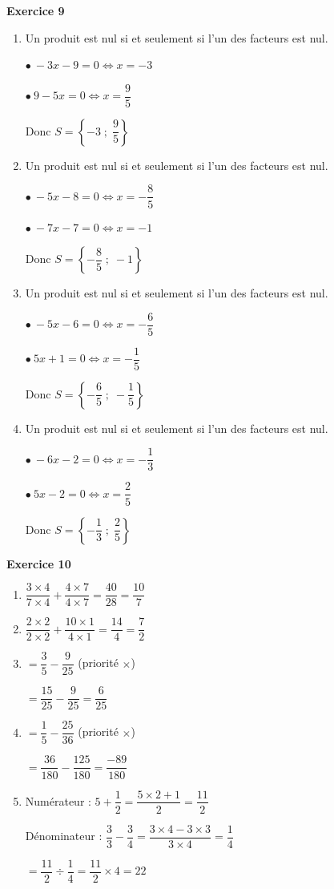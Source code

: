 \documentclass[12pt,a4paper,french]{article}
\begin{document}
\noindent\textbf{Exercice 9}\par
\smallskip
\begin{enumerate}
\item Un produit est nul si et seulement si l'un des facteurs est nul.

$\bullet\ -3x - 9 = 0 \Leftrightarrow x = -3$

$\bullet\ 9 - 5x = 0 \Leftrightarrow x = \dfrac{9}{5}$

Donc $S = \left\{-3 \; ; \; \dfrac{9}{5}\right\}$

\item Un produit est nul si et seulement si l'un des facteurs est nul.

$\bullet\ -5x - 8 = 0 \Leftrightarrow x = - \dfrac{8}{5}$

$\bullet\ -7x - 7 = 0 \Leftrightarrow x = -1$

Donc $S = \left\{- \dfrac{8}{5} \; ; \; -1\right\}$

\item Un produit est nul si et seulement si l'un des facteurs est nul.

$\bullet\ -5x - 6 = 0 \Leftrightarrow x = - \dfrac{6}{5}$

$\bullet\ 5x + 1 = 0 \Leftrightarrow x = - \dfrac{1}{5}$

Donc $S = \left\{- \dfrac{6}{5} \; ; \; - \dfrac{1}{5}\right\}$

\item Un produit est nul si et seulement si l'un des facteurs est nul.

$\bullet\ -6x - 2 = 0 \Leftrightarrow x = - \dfrac{1}{3}$

$\bullet\ 5x - 2 = 0 \Leftrightarrow x = \dfrac{2}{5}$

Donc $S = \left\{- \dfrac{1}{3} \; ; \; \dfrac{2}{5}\right\}$

\end{enumerate}
\medskip

\noindent\textbf{Exercice 10}\par
\smallskip
\begin{enumerate}
\item $\dfrac{3 \times 4}{7 \times 4} + \dfrac{4 \times 7}{4 \times 7} = \dfrac{40}{28} = \dfrac{10}{7}$
\item $\dfrac{2 \times 2}{2 \times 2} + \dfrac{10 \times 1}{4 \times 1} = \dfrac{14}{4} = \dfrac{7}{2}$
\item $= \dfrac{3}{5} - \dfrac{9}{25}$ (priorité $\times$)

$= \dfrac{15}{25} - \dfrac{9}{25} = \dfrac{6}{25}$
\item $= \dfrac{1}{5} - \dfrac{25}{36}$ (priorité $\times$)

$= \dfrac{36}{180} - \dfrac{125}{180} = \dfrac{-89}{180}$
\item Numérateur : $5 + \dfrac{1}{2} = \dfrac{5 \times 2 + 1}{2} = \dfrac{11}{2}$

Dénominateur : $\dfrac{3}{3} - \dfrac{3}{4} = \dfrac{3 \times 4 - 3 \times 3}{3 \times 4} = \dfrac{1}{4}$

$= \dfrac{11}{2} \div \dfrac{1}{4} = \dfrac{11}{2} \times 4 = 22$
\end{enumerate}
\medskip
\end{document}

